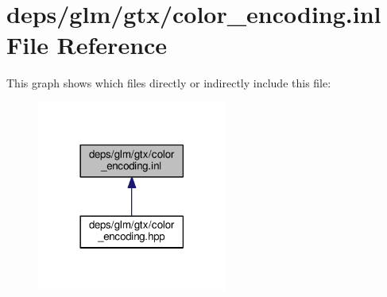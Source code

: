 \hypertarget{color__encoding_8inl}{}\section{deps/glm/gtx/color\+\_\+encoding.inl File Reference}
\label{color__encoding_8inl}
This graph shows which files directly or indirectly include this file\+:
\nopagebreak
\begin{figure}[H]
\begin{center}
\leavevmode
\includegraphics[width=177pt]{d3/d41/color__encoding_8inl__dep__incl}
\end{center}
\end{figure}
